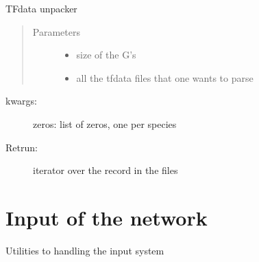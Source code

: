 \documentclass[letterpaper,10pt,english]{sphinxmanual}
\begin{document}
\begin{fulllineitems}
\label{\detokenize{neuralnet/simulation:simulation.iterator_over_tfdata}}
TFdata unpacker
\begin{quote}\begin{description}
\item[{Parameters}] \leavevmode\begin{itemize}
\item {} 
 \textendash{} size of the G’s

\item {} 
 \textendash{} all the tfdata files that one wants to parse

\end{itemize}

\end{description}\end{quote}
\begin{description}
\item[{kwargs:}] \leavevmode
zeros: list of zeros, one per species

\item[{Retrun:}] \leavevmode
iterator over the record in the files

\end{description}

\end{fulllineitems}



\chapter{Input of the network}
\label{\detokenize{neuralnet/inputs:module-inputs}}\label{\detokenize{neuralnet/inputs:input-of-the-network}}\label{\detokenize{neuralnet/inputs::doc}}
Utilities to handling the input system
\end{document}
